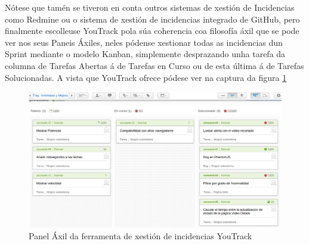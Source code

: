     Nótese que tamén se tiveron en conta outros sistemas de xestión de Incidencias como Redmine ou
    o sistema de xestión de incidencias integrado de GitHub, pero finalmente escolleuse YouTrack 
    pola súa coherencia coa filosofía áxil que se pode ver nos seus Paneis Áxiles, neles pódense
    xestionar todas as incidencias dun Sprint mediante o modelo Kanban, simplemente desprazando unha
    tarefa da columna de Tarefas Abertas á de Tarefas en Curso ou de esta última á de Tarefas 
    Solucionadas. A vista que YouTrack ofrece pódese ver na captura da figura \ref{fig:AgilePanel}
    
    \begin{figure}[htp]
    \begin{center}
        \includegraphics[scale=0.4]{figures/AgilePanel.png}
        \caption{Panel Áxil da ferramenta de xestión de incidencias YouTrack}
    \label{fig:AgilePanel}
    \end{center}
    \end{figure}
    
    
    

